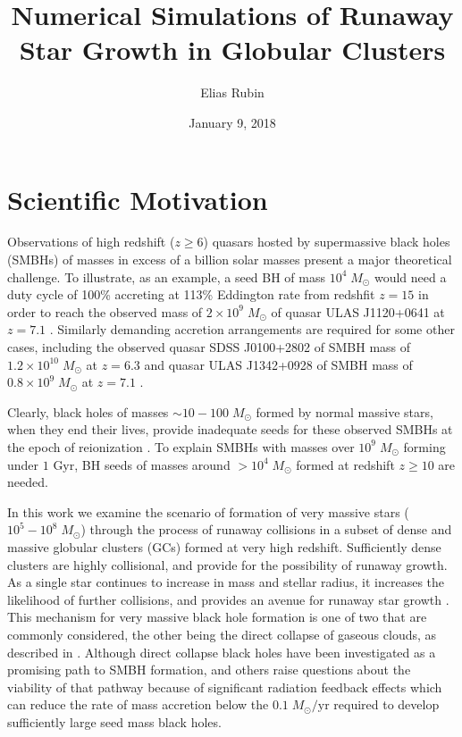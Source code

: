 \documentclass{princeton_astro_thesis}
\title{Numerical Simulations of Runaway Star Growth in Globular Clusters}
\author{Elias Rubin}
\date{January 9, 2018}
\newcommand\Msun{\; M_\odot}
\newcommand\msun{\; M_\odot}
\newcommand\Gyr{\mbox{ Gyr}}
\numberwithin{equation}{section}
\begin{document}
\chapter{Scientific Motivation} \label{Intro}
Observations of high redshift ($z \ge 6$) quasars hosted by supermassive black holes (SMBHs) 
of masses in excess of a billion solar masses 
present a major theoretical challenge.
To illustrate, as an example, 
a seed BH of mass $10^4\msun$ would need a duty cycle of 100\%
accreting at 113\% Eddington rate 
from redshfit $z=15$ in order to reach 
the observed mass of $2\times 10^9\msun$ 
of quasar ULAS J1120+0641 at $z=7.1$ \citep[][]{2011Mortlock}.
Similarly demanding accretion arrangements are required for some other
cases, including 
the observed quasar SDSS J0100+2802 of SMBH mass of $1.2\times 10^{10}\msun$ at $z=6.3$ \citep[][]{2015Wu}
and 
quasar ULAS J1342+0928 of SMBH mass of $0.8\times 10^{9}\msun$ at $z=7.1$ \citep[][]{2017Banados}.

Clearly, black holes of masses $\sim 10-100\msun$ formed by normal massive stars,
when they end their lives,
provide inadequate seeds for these observed SMBHs at the epoch of reionization \citep{2003Bromm, 2013Hosokawa}. 
To explain SMBHs with masses over $10^9 \Msun$ forming under $1 \Gyr$, 
BH seeds of masses around $>10^4\Msun$ formed at redshift $z\ge 10$ are needed.

In this work we examine the scenario of formation of very massive stars
($10^5-10^8\msun$) 
through the process of runaway collisions in 
a subset of dense and massive globular clusters (GCs) formed at very high redshift.
Sufficiently dense clusters are highly collisional, and provide for the possibility of runaway growth. 
As a single star continues to increase in mass and stellar radius, it increases the likelihood of further collisions, and provides an avenue for runaway star growth \citep{2015Katz}. 
This mechanism for very massive black hole formation is one of two that are commonly considered, 
the other being the direct collapse of gaseous clouds, as described in \citet{2003Bromm}.
Although direct collapse black holes have been investigated as a promising path to SMBH formation, 
\citet{2016Latif} and others raise questions about the viability of that pathway because of significant radiation feedback effects which can reduce the rate of mass accretion below the $0.1 \Msun/\mbox{yr}$ required to develop sufficiently large seed mass black holes.
\end{document}
